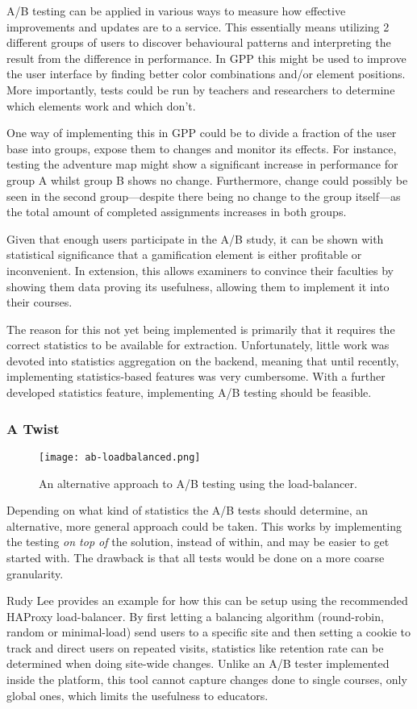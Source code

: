 A/B testing can be applied in various ways to measure how effective improvements and updates are to a service. This essentially means utilizing 2 different groups of users to discover behavioural patterns and interpreting the result from the difference in performance. In GPP this might be used to improve the user interface by finding better color combinations and/or element positions. More importantly, tests could be run by teachers and researchers to determine which elements work and which don't.

One way of implementing this in GPP could be to divide a fraction of the user base into groups, expose them to changes and monitor its effects. For instance, testing the adventure map might show a significant increase in performance for group A whilst group B shows no change. Furthermore, change could possibly be seen in the second group---despite there being no change to the group itself---as the total amount of completed assignments increases in both groups.

Given that enough users participate in the A/B study, it can be shown with statistical significance that a gamification element is either profitable or inconvenient. In extension, this allows examiners to convince their faculties by showing them data proving its usefulness, allowing them to implement it into their courses.

The reason for this not yet being implemented is primarily that it requires the correct statistics to be available for extraction. Unfortunately, little work was devoted into statistics aggregation on the backend, meaning that until recently, implementing statistics-based features was very cumbersome. With a further developed statistics feature, implementing A/B testing should be feasible.

\subsubsection{A Twist}
\begin{wrapfigure}[14]{r}{6cm}
    \centering
    \texttt{[image: ab-loadbalanced.png]}
    \caption{An alternative approach to A/B testing using the load-balancer.}
\end{wrapfigure}
Depending on what kind of statistics the A/B tests should determine, an alternative, more general approach could be taken. This works by implementing the testing \textit{on top of} the solution, instead of within, and may be easier to get started with. The drawback is that all tests would be done on a more coarse granularity.

Rudy Lee provides an example\cite{rudylee} for how this can be setup using the recommended HAProxy load-balancer. By first letting a balancing algorithm (round-robin, random or minimal-load) send users to a specific site and then setting a cookie to track and direct users on repeated visits, statistics like retention rate can be determined when doing site-wide changes. Unlike an A/B tester implemented inside the platform, this tool cannot capture changes done to single courses, only global ones, which limits the usefulness to educators.
